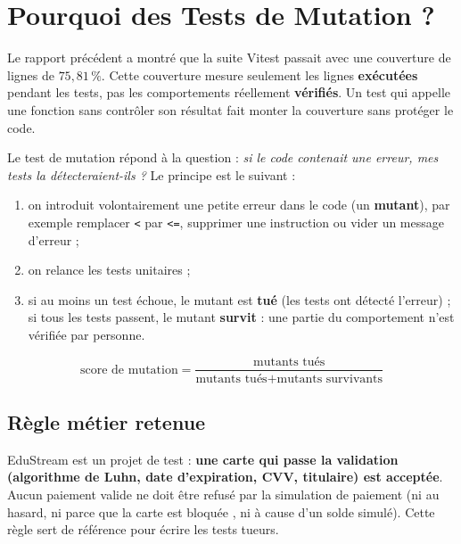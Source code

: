 \documentclass[12pt,a4paper]{article}
\begin{document}
\section{Pourquoi des Tests de Mutation ?}
Le rapport précédent a montré que la suite Vitest passait avec une couverture de lignes de $75{,}81\,\%$. Cette couverture mesure seulement les lignes \textbf{exécutées} pendant les tests, pas les comportements réellement \textbf{vérifiés}. Un test qui appelle une fonction sans contrôler son résultat fait monter la couverture sans protéger le code.

Le test de mutation répond à la question : \textit{\og si le code contenait une erreur, mes tests la détecteraient-ils ? \fg{}} Le principe est le suivant :
\begin{enumerate}
    \item on introduit volontairement une petite erreur dans le code (un \textbf{mutant}), par exemple remplacer \texttt{<} par \texttt{<=}, supprimer une instruction ou vider un message d'erreur ;
    \item on relance les tests unitaires ;
    \item si au moins un test échoue, le mutant est \textbf{tué} (les tests ont détecté l'erreur) ; si tous les tests passent, le mutant \textbf{survit} : une partie du comportement n'est vérifiée par personne.
\end{enumerate}
\[
\text{score de mutation} = \frac{\text{mutants tués}}{\text{mutants tués} + \text{mutants survivants}}
\]

\subsection{Règle métier retenue}
EduStream est un projet de test : \textbf{une carte qui passe la validation (algorithme de Luhn, date d'expiration, CVV, titulaire) est acceptée}. Aucun paiement valide ne doit être refusé par la simulation de paiement (ni au hasard, ni parce que la carte est \og bloquée \fg{}, ni à cause d'un solde simulé). Cette règle sert de référence pour écrire les tests tueurs.
\end{document}
